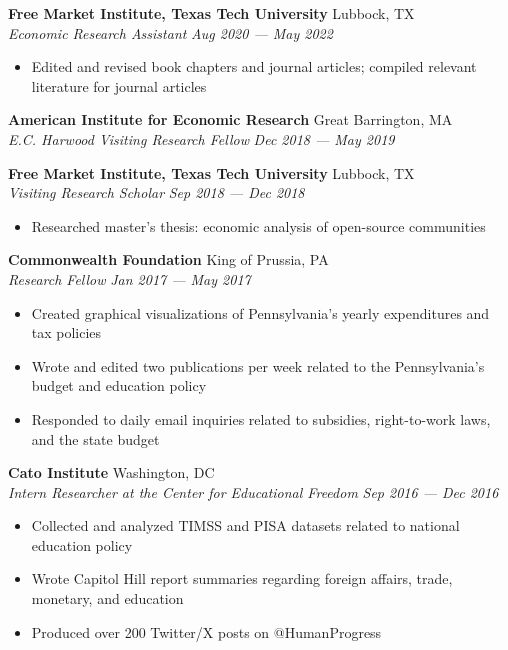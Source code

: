 \documentclass[a4paper,11pt]{article}
\begin{document}
\textbf{Free Market Institute, Texas Tech University} \hfill Lubbock, TX\\
\textit{Economic Research Assistant} \hfill  \emph{Aug 2020 --- May 2022} \\
\begin{itemize}
    \item Edited and revised book chapters and journal articles; compiled relevant literature for journal articles
\end{itemize}
\vspace{1mm}

\textbf{American Institute for Economic Research} \hfill Great Barrington, MA\\
\textit{E.C. Harwood Visiting Research Fellow} \hfill  \emph{Dec 2018 --- May 2019}\\
\vspace{1mm}

\textbf{Free Market Institute, Texas Tech University} \hfill Lubbock, TX\\
\textit{Visiting Research Scholar} \hfill  \emph{Sep 2018 --- Dec 2018}\\
\begin{itemize}
    \item Researched master's thesis: economic analysis of open-source communities
\end{itemize}
\vspace{1mm}

\textbf{Commonwealth Foundation} \hfill King of Prussia, PA\\
\textit{Research Fellow} \hfill  \emph{Jan 2017 --- May 2017}\\
\begin{itemize}
    \item Created graphical visualizations of Pennsylvania's yearly expenditures and tax policies
    \item Wrote and edited two publications per week related to the Pennsylvania's budget and education policy
    \item Responded to daily email inquiries related to subsidies, right-to-work laws, and the state budget
\end{itemize}
\vspace{1mm}

\textbf{Cato Institute} \hfill Washington, DC\\
\textit{Intern Researcher at the Center for Educational Freedom} \hfill \emph{Sep 2016 --- Dec 2016}\\
\begin{itemize}
    \item Collected and analyzed TIMSS and PISA datasets related to national education policy
    \item Wrote Capitol Hill report summaries regarding foreign affairs, trade, monetary, and education
    \item Produced over 200 Twitter/X posts on @HumanProgress
\end{itemize}
\vspace{1mm}
\end{document}
